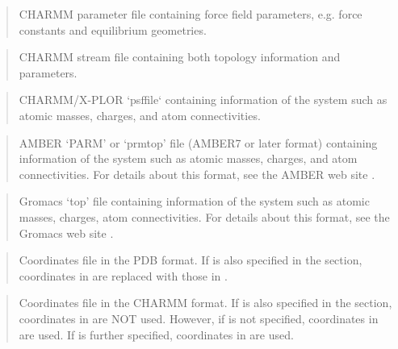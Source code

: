 \documentclass[a4paper,11pt,oneside,english]{sphinxmanual}
\begin{document}
\begin{quote}

CHARMM parameter file containing force field parameters,
e.g. force constants and equilibrium geometries.
\end{quote}

\begin{quote}

CHARMM stream file containing both topology information and parameters.
\end{quote}

\begin{quote}

CHARMM/X-PLOR ‘psffile{}` containing information of the system
such as atomic masses, charges, and atom connectivities.
\end{quote}

\begin{quote}

AMBER ‘PARM’ or ‘prmtop’ file (AMBER7 or later format) containing
information of the system such as atomic masses, charges, and atom
connectivities. For details about this format, see the AMBER web site
.
\end{quote}

\begin{quote}

Gromacs ‘top’ file containing information of the system
such as atomic masses, charges, atom connectivities.
For details about this format, see the Gromacs web site
.
\end{quote}

\begin{quote}

Coordinates file in the PDB format.
If  is also specified in the \sphinxstylestrong{{[}INPUT{]}} section,
coordinates in  are replaced with those in .
\end{quote}

\begin{quote}

Coordinates file in the CHARMM format.
If  is also specified in the \sphinxstylestrong{{[}INPUT{]}} section, coordinates in  are NOT used.
However, if  is not specified, coordinates in  are used.
If  is further specified, coordinates in  are used.
\end{quote}
\end{document}
